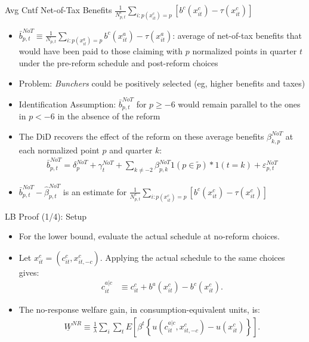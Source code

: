 \begin{frame}[label=netOfTaxBenefits]{Avg Cntf Net-of-Tax Benefits $\frac{1}{N_{p,t}^c}\sum_{i:p(x_{it}^c)=p}[b^c(x_{it}^c)-\tau(x^c_{it})]$}
    \begin{itemize}
        \item $\bar{b}^{NoT}_{p,t} \equiv \frac{1}{N_{p,t}} \sum_{i:p(x_{it}^a)=p}b^c(x_{it}^a)-\tau(x_{it}^a)$: average of net-of-tax benefits that would have been paid to those claiming with $p$ normalized points in quarter $t$ under the pre-reform schedule and post-reform choices
        \item Problem: \textit{Bunchers} could be positively selected (eg, higher benefits and taxes)
        \item Identification Assumption: $\bar{b}^{NoT}_{p,t}$ for $p\geq -6$ would remain parallel to the ones in $p<-6$ in the absence of the reform
        \item The DiD recovers the effect of the reform on these average benefits $\beta^{NoT}_{k,p}$ at each normalized point $p$ and quarter $k$:
         \begin{align*}
            \bar{b}^{NoT}_{p,t}=\delta_p^{NoT}+\gamma_t^{NoT} +\sum_{k\neq -2}\beta_{p,k}^{NoT} 1(p\in \tilde p)*1(t=k)+\varepsilon_{p,t}^{NoT}
        \end{align*}
        \item $\bar{b}^{NoT}_{p,t}-\hat \beta_{p,t}^{NoT}$ is an estimate for $\frac{1}{N_{p,t}^c}\sum_{i:p(x^c_{it})=p}[b^c(x^c_{it})-\tau(x^c_{it})]$
    \end{itemize}
\end{frame}

\begin{frame}[label=lbProofSetup]{LB Proof (1/4): Setup}
    \small
    \begin{itemize}
        \item For the lower bound, evaluate the actual schedule at no-reform choices.
        \item Let \(x^c_{it}=(c^c_{it},x^c_{it,-c})\). Applying the actual schedule to the same choices gives:
        \begin{align*}
            c^{a|c}_{it}
            &\equiv c^c_{it}+b^a(x^c_{it})-b^c(x^c_{it}).
        \end{align*}
        \item The no-response welfare gain, in consumption-equivalent units, is:
        \begin{align*}
            \underline W^{NR}
            \equiv
            \frac{1}{\lambda}\sum_i\sum_t E\left[
            \beta^t
            \left\{
            u(c^{a|c}_{it},x^c_{it,-c})
            -
            u(x^c_{it})
            \right\}
            \right].
        \end{align*}
    \end{itemize}
\end{frame}

